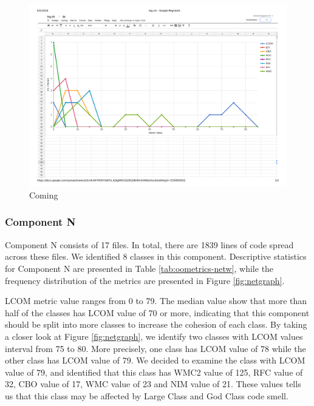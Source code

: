 \begin{landscape}
\setlength\LTleft{-.5in}
	\begin{figure}
	\centering
	\includegraphics[width=\textwidth]{images/pdf/log.pdf}
	\caption{Coming}
	\label{fig:loggraph}
	\end{figure}
\end{landscape}







\subsubsection{Component N}
Component N consists of 17 files. In total, there are 1839 lines of code spread across these files. We identified 8 classes in this component. Descriptive statistics for Component N are presented in Table \ref{tab:oometrics-netw}, while the frequency distribution of the metrics are presented in Figure \ref{fig:netgraph}.

LCOM metric value ranges from 0 to 79. The median value show that more than half of the classes has LCOM value of 70 or more, indicating that this component should be split into more classes to increase the cohesion of each class. By taking a closer look at Figure \ref{fig:netgraph}, we identify two classes with LCOM values interval from 75 to 80. More precisely, one class has LCOM value of 78 while the other class has LCOM value of 79. We decided to examine the class with LCOM value of 79, and identified that this class has WMC2 value of 125, RFC value of 32, CBO value of 17, WMC value of 23 and NIM value of 21. These values tells us that this class may be affected by Large Class and God Class code smell.


